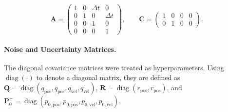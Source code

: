    
\begin{equation}
    \mathbf{A} = \begin{pmatrix}
        1 & 0 & \Delta t & 0 \\
        0 & 1 & 0        & \Delta t \\
        0 & 0 & 1        & 0 \\
        0 & 0 & 0        & 1
    \end{pmatrix},
    \qquad
    \mathbf{C} = \begin{pmatrix} 1 & 0 & 0 & 0 \\ 0 & 1 & 0 & 0 \end{pmatrix}.
    \label{eq:state_and_observation_matrices}
\end{equation}

    

    \paragraph{Noise and Uncertainty Matrices.}

The diagonal covariance matrices were treated as hyperparameters. Using $\operatorname{diag}(\cdot)$ to denote a diagonal matrix, they are defined as $\mathbf{Q} = \operatorname{diag}(q_\text{pos}, q_\text{pos}, q_\text{vel}, q_\text{vel})$, $\mathbf{R} = \operatorname{diag}(r_\text{pos}, r_\text{pos})$, and $\mathbf{P}^+_0 = \operatorname{diag}(p_{0,\text{pos}}, p_{0,\text{pos}}, p_{0,\text{vel}}, p_{0,\text{vel}})$.
        
